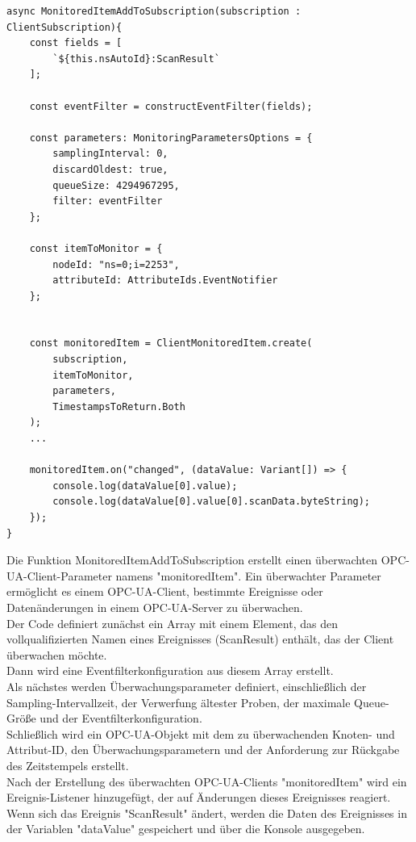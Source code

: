 \begin{lstlisting}[style=JavaScript, caption={MonitoredItemAddToSubscription}]
async MonitoredItemAddToSubscription(subscription : ClientSubscription){
    const fields = [
        `${this.nsAutoId}:ScanResult`
    ];

    const eventFilter = constructEventFilter(fields);

    const parameters: MonitoringParametersOptions = {
        samplingInterval: 0,
        discardOldest: true,
        queueSize: 4294967295,
        filter: eventFilter
    };

    const itemToMonitor = {
        nodeId: "ns=0;i=2253",
        attributeId: AttributeIds.EventNotifier
    };


    const monitoredItem = ClientMonitoredItem.create(
        subscription,
        itemToMonitor,
        parameters,
        TimestampsToReturn.Both
    );
    ...
    
    monitoredItem.on("changed", (dataValue: Variant[]) => {
        console.log(dataValue[0].value);
        console.log(dataValue[0].value[0].scanData.byteString);
    });
}
\end{lstlisting}

Die Funktion \dq MonitoredItemAddToSubscription \dq erstellt einen überwachten OPC-UA-Client-Parameter namens "monitoredItem". Ein überwachter Parameter ermöglicht es einem OPC-UA-Client, bestimmte Ereignisse oder Datenänderungen in einem OPC-UA-Server zu überwachen.\\

Der Code definiert zunächst ein Array mit einem Element, das den vollqualifizierten Namen eines Ereignisses (ScanResult) enthält, das der Client überwachen möchte.\\

Dann wird eine Eventfilterkonfiguration aus diesem Array erstellt.\\

Als nächstes werden Überwachungsparameter definiert, einschließlich der Sampling-Intervallzeit, der Verwerfung ältester Proben, der maximale Queue-Größe und der Eventfilterkonfiguration.\\

Schließlich wird ein OPC-UA-Objekt mit dem zu überwachenden Knoten- und Attribut-ID, den Überwachungsparametern und der Anforderung zur Rückgabe des Zeitstempels erstellt.\\

Nach der Erstellung des überwachten OPC-UA-Clients "monitoredItem" wird ein Ereignis-Listener hinzugefügt, der auf Änderungen dieses Ereignisses reagiert. Wenn sich das Ereignis "ScanResult" ändert, werden die Daten des Ereignisses in der Variablen "dataValue" gespeichert und über die Konsole ausgegeben.\\

